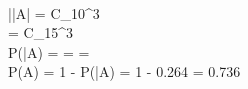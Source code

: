 \documentclass{article}
\begin{document}
\\ |\bar{A}| = C_{10}^{3} \\
\Omega = C_{15}^{3} \\
P(\bar{A}) =  =  =   \\
P(A) = 1 - P(\bar{A}) = 1 - 0.264 = 0.736
\end{document}
